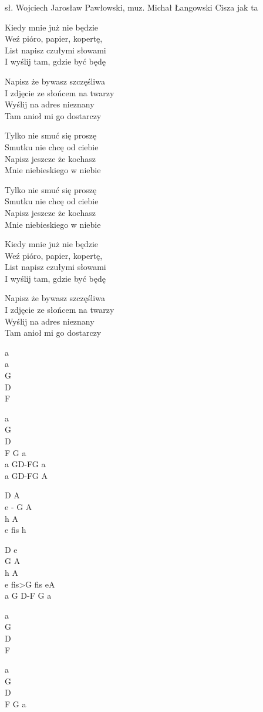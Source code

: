 {sł. Wojciech Jarosław Pawłowski, muz. Michał Łangowski}
{Cisza jak ta}
\begin{textn}

Kiedy mnie już nie będzie\\
Weź pióro, papier, kopertę,\\
List napisz czułymi słowami\\
I wyślij tam, gdzie być będę

Napisz że bywasz szczęśliwa\\
I zdjęcie ze słońcem na twarzy\\
Wyślij na adres nieznany\\
Tam anioł mi go dostarczy

\vin Tylko nie smuć się proszę\\
\vin Smutku nie chcę od ciebie\\
\vin Napisz jeszcze że kochasz\\
\vin Mnie niebieskiego w niebie

\vin Tylko nie smuć się proszę\\
\vin Smutku nie chcę od ciebie\\
\vin Napisz jeszcze że kochasz\\
\vin Mnie niebieskiego w niebie


Kiedy mnie już nie będzie\\
Weź pióro, papier, kopertę,\\
List napisz czułymi słowami\\
I wyślij tam, gdzie być będę

Napisz że bywasz szczęśliwa\\
I zdjęcie ze słońcem na twarzy\\
Wyślij na adres nieznany\\
Tam anioł mi go dostarczy

\end{textn}
\begin{chord}
\ifOneCol \else \footnotesize{\fi
a\\
a\\
G\\
D\\
F

a\\
G\\
D\\
F G a\\
a GD-FG a\\
a GD-FG A

D A\\
e - G A\\
h A\\
e fis h

D e\\
G A\\
h A\\
e fis>G fis eA\\
a G D-F G a

a\\
G\\
D\\
F

a\\
G\\
D\\
F G a
\ifOneCol \else }\fi
\end{chord}
